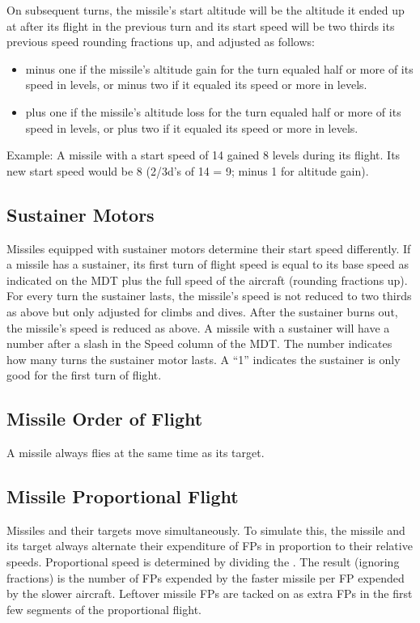 On subsequent turns, the missile's start altitude will be the altitude it ended up at after its flight in the previous turn and its start speed will be two thirds its previous speed rounding fractions up, and adjusted as follows:

\begin{itemize}

    \item minus one if the missile's altitude gain for the turn equaled half or more of its speed in levels, or minus two if it equaled its speed or more in levels.

    \item plus one if the missile's altitude loss for the turn equaled half or more of its speed in levels, or plus two if it equaled its speed or more in levels.

\end{itemize}

Example: A missile with a start speed of 14 gained 8 levels during its flight. Its new start speed would be 8 (2/3d's of 14 = 9; minus 1 for altitude gain).

\subsection{Sustainer Motors} Missiles equipped with sustainer motors determine their start speed differently. If a missile has a sustainer, its first turn of flight speed is equal to its base speed as indicated on the MDT plus the full speed of the aircraft (rounding fractions up). For every turn the sustainer lasts, the missile's speed is not reduced to two thirds as above but only adjusted for climbs and dives. After the sustainer burns out, the missile's speed is reduced as above. A missile with a sustainer will have a number after a slash in the Speed column of the MDT. The number indicates how many turns the sustainer motor lasts.  A “1” indicates the sustainer is only good for the first turn of flight.

\subsection{Missile Order of Flight} A missile always flies at the same time as its target.

\subsection{Missile Proportional Flight} Missiles and their targets move simultaneously. To simulate this, the missile and its target always alternate their expenditure of FPs in proportion to their relative speeds. Proportional speed is determined by dividing the . The result (ignoring fractions) is the number of FPs expended by the faster missile per FP expended by the slower aircraft.  Leftover missile FPs are tacked on as extra FPs in the first few segments of the proportional flight.

